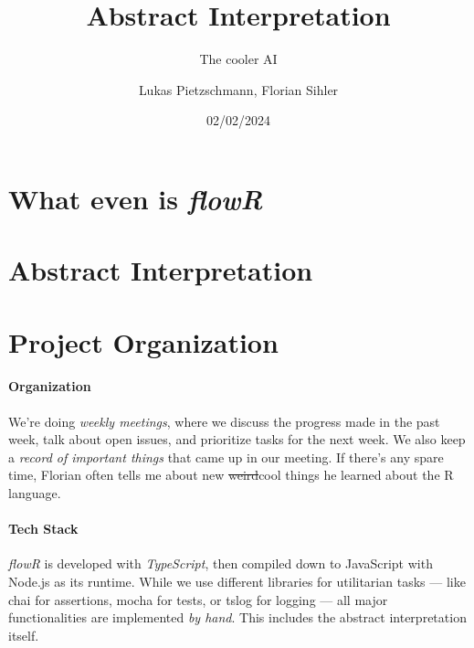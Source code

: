 \documentclass[color,coloraccent=red!60!black]{poster}
\title{Abstract Interpretation}
\subtitle{The cooler AI}
\author{Lukas Pietzschmann, Florian Sihler}
\institute{Institute of Software Engineering and Programming Languages}
\date{02/02/2024}
\def\flowr{\textit{flowR}}
\begin{document}
\maketitle


\begin{multicols}{3}
	\begin{minipage}{\dimexpr2\columnwidth+\columnsep\relax}
		\section*{What even is \flowr}
		\lipsum[4]
		\section*{Abstract Interpretation}
		\lipsum[1-3]
	\end{minipage}\vfill\columnbreak\null\columnbreak
	\section*{Project Organization}
	\paragraph{Organization} We're doing \emph{weekly meetings}, where we discuss the
	progress made in the past week, talk about open issues, and prioritize tasks for the
	next week. We also keep a \emph{record of important things} that came up in our
	meeting. If there's any spare time, Florian often tells me about new
	\sout{weird}cool things he learned about the R language.
	\paragraph{Tech Stack} \flowr{} is developed with \emph{TypeScript}, then compiled
	down to JavaScript with Node.js as its runtime. While we use different libraries for
	utilitarian tasks --- like chai for assertions, mocha for tests, or tslog for
	logging --- all major functionalities are implemented \emph{by hand}. This includes
	the abstract interpretation itself.

\end{multicols}
\end{document}
